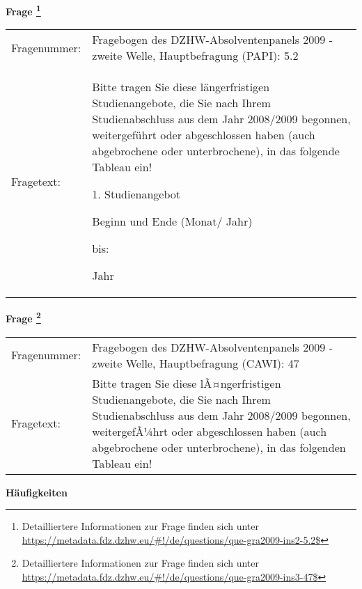 				\vspace*{0.5cm}
                \noindent\textbf{Frage
	                \footnote{Detailliertere Informationen zur Frage finden sich unter
		              \url{https://metadata.fdz.dzhw.eu/\#!/de/questions/que-gra2009-ins2-5.2$}}}\\
				\begin{tabularx}{\hsize}{@{}lX}
					Fragenummer: &
					  Fragebogen des DZHW-Absolventenpanels 2009 - zweite Welle, Hauptbefragung (PAPI):
					  5.2
 \\
					Fragetext: & Bitte tragen Sie diese längerfristigen Studienangebote, die Sie nach Ihrem Studienabschluss aus dem Jahr 2008/2009 begonnen, weitergeführt oder abgeschlossen haben (auch abgebrochene oder unterbrochene), in das folgende Tableau ein!\par  1. Studienangebot\par  Beginn und Ende (Monat/ Jahr)\par  bis:\par  Jahr \\
				\end{tabularx}
				\vspace*{0.5cm}
                \noindent\textbf{Frage
	                \footnote{Detailliertere Informationen zur Frage finden sich unter
		              \url{https://metadata.fdz.dzhw.eu/\#!/de/questions/que-gra2009-ins3-47$}}}\\
				\begin{tabularx}{\hsize}{@{}lX}
					Fragenummer: &
					  Fragebogen des DZHW-Absolventenpanels 2009 - zweite Welle, Hauptbefragung (CAWI):
					  47
 \\
					Fragetext: & Bitte tragen Sie diese lÃ¤ngerfristigen Studienangebote, die Sie nach Ihrem Studienabschluss aus dem Jahr 2008/2009 begonnen, weitergefÃ¼hrt oder abgeschlossen haben (auch abgebrochene oder unterbrochene), in das folgenden Tableau ein! \\
				\end{tabularx}





        		\vspace*{0.5cm}
                \noindent\textbf{Häufigkeiten}

